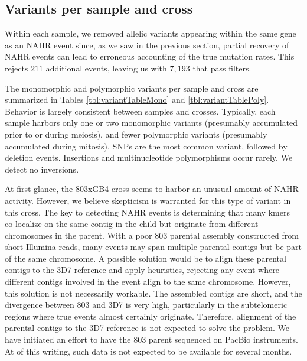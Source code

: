\subsection{Variants per sample and cross}

Within each sample, we removed allelic variants appearing within the same gene as an NAHR event since, as we saw in the previous section, partial recovery of NAHR events can lead to erroneous accounting of the true mutation rates.  This rejects $211$ additional events, leaving us with $7,193$ that pass filters.

The monomorphic and polymorphic variants per sample and cross are summarized in Tables \ref{tbl:variantTableMono} and \ref{tbl:variantTablePoly}.  Behavior is largely consistent between samples and crosses.  Typically, each sample harbors only one or two monomorphic variants (presumably accumulated prior to or during meiosis), and fewer polymorphic variants (presumably accumulated during mitosis).  SNPs are the most common variant, followed by deletion events.  Insertions and multinucleotide polymorphisms occur rarely.  We detect no inversions.

At first glance, the 803xGB4 cross seems to harbor an unusual amount of NAHR activity.  However, we believe skepticism is warranted for this type of variant in this cross.  The key to detecting NAHR events is determining that many kmers co-localize on the same contig in the child but originate from different chromosomes in the parent.  With a poor 803 parental assembly constructed from short Illumina reads, many events may span multiple parental contigs but be part of the same chromosome.  A possible solution would be to align these parental contigs to the 3D7 reference and apply heuristics, rejecting any event where different contigs involved in the event align to the same chromosome.  However, this solution is not necessarily workable.  The assembled contigs are short, and the divergence between 803 and 3D7 is very high, particularly in the subtelomeric regions where true events almost certainly originate.  Therefore, alignment of the parental contigs to the 3D7 reference is not expected to solve the problem.  We have initiated an effort to have the 803 parent sequenced on PacBio instruments.  At of this writing, such data is not expected to be available for several months.

